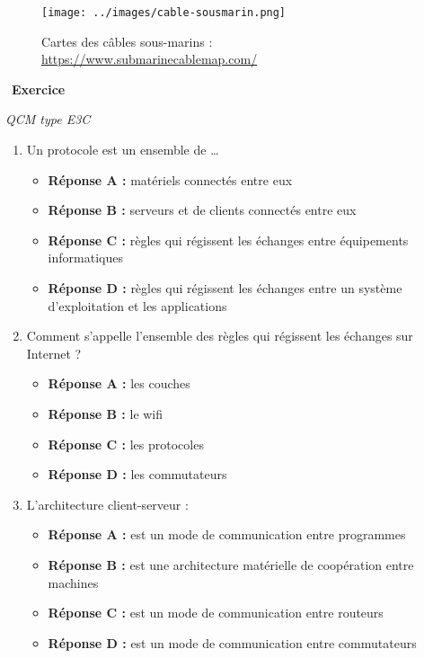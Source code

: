 \documentclass[
  11pt,
]{article}
\providecommand{\tightlist}{%
  \setlength{\itemsep}{0pt}\setlength{\parskip}{0pt}}
\newcounter{exo}
\newenvironment{exercice}[1]
{\par \medskip   \addtocounter{exo}{1} \noindent  
\begin{bclogo}[arrondi =0.1,   noborder = true, logo=\bccrayon, marge=4]{~\textbf{Exercice} \textbf{\theexo} {\itshape #1} }  \par}
{
\end{bclogo}
 \par \bigskip }
\newcounter{def}
\newcounter{prog}
\begin{document}
\begin{figure}
\centering
\texttt{[image: ../images/cable-sousmarin.png]}
\caption{Cartes des câbles sous-marins :
\url{https://www.submarinecablemap.com/}}
\end{figure}

\begin{exercice}{}

\emph{QCM type E3C}

\begin{enumerate}
\def\labelenumi{\arabic{enumi}.}
\item
  Un protocole est un ensemble de \ldots{}

  \begin{itemize}
  \tightlist
  \item
    \textbf{Réponse A :} matériels connectés entre eux
  \item
    \textbf{Réponse B :} serveurs et de clients connectés entre eux
  \item
    \textbf{Réponse C :} règles qui régissent les échanges entre
    équipements informatiques
  \item
    \textbf{Réponse D :} règles qui régissent les échanges entre un
    système d'exploitation et les applications
  \end{itemize}
\item
  Comment s'appelle l'ensemble des règles qui régissent les échanges sur
  Internet ?

  \begin{itemize}
  \tightlist
  \item
    \textbf{Réponse A :} les couches
  \item
    \textbf{Réponse B :} le wifi
  \item
    \textbf{Réponse C :} les protocoles
  \item
    \textbf{Réponse D :} les commutateurs
  \end{itemize}
\item
  L'architecture client-serveur :

  \begin{itemize}
  \tightlist
  \item
    \textbf{Réponse A :} est un mode de communication entre programmes
  \item
    \textbf{Réponse B :} est une architecture matérielle de coopération
    entre machines
  \item
    \textbf{Réponse C :} est un mode de communication entre routeurs
  \item
    \textbf{Réponse D :} est un mode de communication entre commutateurs
  \end{itemize}
\end{enumerate}

\end{exercice}
\end{document}

